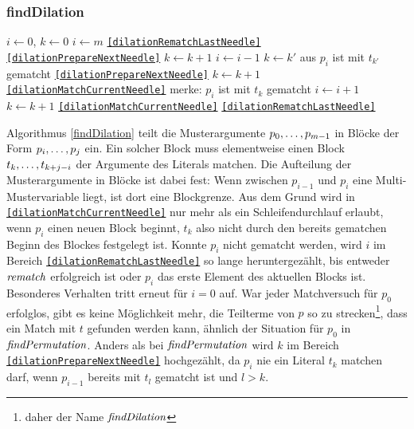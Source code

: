 \subsubsection {findDilation}
\begin{algorithm}
\DontPrintSemicolon
\caption{$\Const{findDilation} \colon M \times T \times \mathit{Bool} \rightarrow \mathit{Bool}$}\label{findDilation}
\Let $i \leftarrow 0$, $k \leftarrow 0$\;
 {
	$i \leftarrow m$\;
	\Goto \texttt{\ref{dilationRematchLastNeedle}}\;
}
 {
}
 {
}
 \label{dilationMatchCurrentNeedle} 
 {
	 { 
		 {
			\Goto \texttt{\ref{dilationPrepareNextNeedle}}\;
		}
		$k \leftarrow k + 1$\;
	}
}
 \label{dilationRematchLastNeedle} 
 {
	$i \leftarrow i - 1$\;
	{$k \leftarrow k'$ aus \glqq $p_{i}$ ist mit $t_{k'}$ gematcht\grqq{}}\;
	 {
		\Goto \texttt{\ref{dilationPrepareNextNeedle}}\;
	}
	 {
		$k \leftarrow k + 1$\;
	\Goto \texttt{\ref{dilationMatchCurrentNeedle}}\;
	}
}
\;
 \label{dilationPrepareNextNeedle} 
merke: $p_i$ ist mit $t_k$ gematcht\;
$i \leftarrow i + 1$\;
$k \leftarrow k + 1$\;
 {
	\Goto \texttt{\ref{dilationMatchCurrentNeedle}}\;
}
 {
	\Goto \texttt{\ref{dilationRematchLastNeedle}}\;
}
\end{algorithm}


Algorithmus \ref{findDilation} teilt die Musterargumente ${p}_{0}, \dots, {p}_{m-1}$ in Blöcke der Form ${p}_{i}, \dots, {p}_{j}$ ein. Ein solcher Block muss elementweise einen Block ${t}_{k}, \dots, {t}_{k + j - i}$ der Argumente des Literals matchen. Die Aufteilung der Musterargumente in Blöcke ist dabei fest: Wenn zwischen $p_{i-1}$ und $p_{i}$ eine Multi-Mustervariable liegt, ist dort eine Blockgrenze. Aus dem Grund wird in \texttt{\ref{dilationMatchCurrentNeedle}} nur mehr als ein Schleifendurchlauf erlaubt, wenn $p_i$ einen neuen Block beginnt, $t_k$ also nicht durch den bereits gematchen Beginn des Blockes festgelegt ist. 
Konnte $p_i$ nicht gematcht werden, wird  $i$ im Bereich \texttt{\ref{dilationRematchLastNeedle}} so lange heruntergezählt, bis entweder $\mathit{rematch}$ erfolgreich ist oder $p_i$ das erste Element des aktuellen Blocks ist. Besonderes Verhalten tritt erneut für $i = 0$ auf. War jeder Matchversuch für $p_0$ erfolglos, gibt es keine Möglichkeit mehr, die Teilterme von $p$ so zu \glqq strecken\grqq{}\footnote{daher der Name $\mathit{findDilation}$}, dass ein Match mit $t$ gefunden werden kann, ähnlich der Situation für $p_0$ in $\mathit{findPermutation}$. Anders als bei $\mathit{findPermutation}$ wird $k$ im Bereich \texttt{\ref{dilationPrepareNextNeedle}} hochgezählt, da $p_i$ nie ein Literal $t_k$ matchen darf, wenn $p_{i-1}$ bereits mit $t_l$ gematcht ist und $l > k$.


